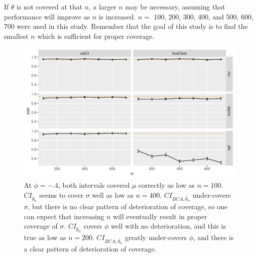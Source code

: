 \documentclass[12pt, letterpaper, titlepage]{article}
\begin{document}
If $\theta$ is not covered at that $n$, a larger $n$ may be
necessary, assuming that performance will improve as $n$ is increased. $n =$
100, 200, 300, 400, and 500, 600, 700 were used in this study. Remember that
the goal of this study is to find the smallest $n$ which is sufficient for
proper coverage. 


\begin{figure}[tbp]
  \centering
  \includegraphics[width=\textwidth]{figures/plot_n.4}
  \caption{At $\phi = -.4$, both intervals covered $\mu$ correctly as low as
    $n = 100$. $CI_{\hat{\theta}_{n}}$ seems to cover $\sigma$ well as low as
    $n = 400$. $CI_{BCA, \hat{\theta}_{n}}$ under-covers $\sigma$, but there
    is no clear pattern of deterioration of coverage, so one can expect that
    increasing $n$ will eventually result in proper coverage of $\sigma$.
    $CI_{\hat{\theta}_{n}}$ covers $\phi$ well with no deterioration, and this
    is true as low as $n = 200$. $CI_{BCA, \hat{\theta}_{n}}$ greatly
    under-covers $\phi$, and there is a clear pattern of deterioration of
    coverage.}
  \label{fig:plot_n.4}
\end{figure}
\end{document}
